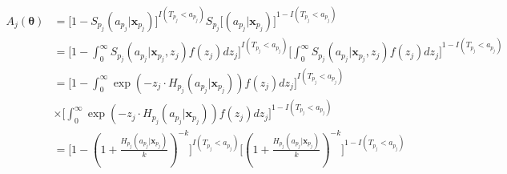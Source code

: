 \documentclass[preprint,12pt]{elsarticle}
\begin{document}
\begin{align}
    A_j(\boldsymbol{\theta})&=\Big [1-S_{p_j}(a_{p_j}|\mathbf{x}_{p_j})\Big ]^{I(T_{p_j}<a_{p_j})}S_{p_j}\Big [(a_{p_j}|\mathbf{x}_{p_j})\Big ]^{1-I(T_{p_j}<a_{p_j})}\\
    &=\Big [1-\int_0^{\infty} S_{p_j}(a_{p_j}|\mathbf{x}_{p_j},z_j)f(z_j)dz_j\Big ]^{I(T_{p_j}<a_{p_j})}\Big [\int_0^{\infty} S_{p_j}(a_{p_j}|\mathbf{x}_{p_j},z_j)f(z_j)dz_j\Big ]^{1-I(T_{p_j}<a_{p_j})}\\
    &=\Big [1-\int_0^{\infty}\exp(-z_j\cdot H_{p_j}(a_{p_j}|\mathbf{x}_{p_j}))f(z_j)dz_j\Big ]^{I(T_{p_j}<a_{p_j})} \\
    &\times \Big [ \int_0^{\infty}\exp(-z_j\cdot H_{p_j}(a_{p_j}|\mathbf{x}_{p_j}))f(z_j)dz_j\Big ]^{1-I(T_{p_j}<a_{p_j})}\\
    &=\Big [1-(1+\frac{H_{p_j}(a_{p_j}|\mathbf{x}_{p_j})}{k})^{-k}\Big ]^{I(T_{p_j}<a_{p_j})}\Big [ (1+\frac{H_{p_j}(a_{p_j}|\mathbf{x}_{p_j})}{k})^{-k}\Big ]^{1-I(T_{p_j}<a_{p_j})}
\end{align}
\end{document}
